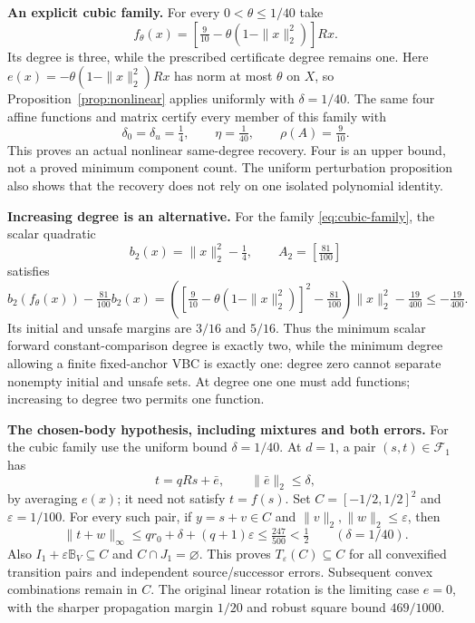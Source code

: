 \documentclass[10pt,letterpaper]{article}
\theoremstyle{remark}
\newcommand{\ball}{\mathbb B_V}
\begin{document}
\textbf{An explicit cubic family.}
For every $0<\theta\leq1/40$ take
\begin{equation}\label{eq:cubic-family}
 f_\theta(x)=\left[\tfrac9{10}-\theta(1-\|x\|_2^2)\right]Rx.
\end{equation}
Its degree is three, while the prescribed certificate degree remains one.
Here $e(x)=-\theta(1-\|x\|_2^2)Rx$ has norm at most $\theta$ on $X$,
so Proposition~\ref{prop:nonlinear} applies uniformly with $\delta=1/40$.
The same four affine functions and matrix certify every member of this family with
\[
 \delta_0=\delta_u=\tfrac14,\qquad \eta=\tfrac1{40},\qquad \rho(A)=\tfrac9{10}.
\]
This proves an actual nonlinear same-degree recovery. Four is an upper bound, not a proved minimum component count. The uniform perturbation proposition also shows that the recovery does not rely on one isolated polynomial identity.

\textbf{Increasing degree is an alternative.}
For the family \eqref{eq:cubic-family}, the scalar quadratic
\[
 b_2(x)=\|x\|_2^2-\tfrac14,\qquad A_2=[\tfrac{81}{100}]
\]
satisfies
\[
 b_2(f_\theta(x))-\tfrac{81}{100}b_2(x)
 =\left(\left[\tfrac9{10}-\theta(1-\|x\|_2^2)\right]^2-\tfrac{81}{100}\right)
       \|x\|_2^2-\tfrac{19}{400}
 \leq-\tfrac{19}{400}.
\]
Its initial and unsafe margins are $3/16$ and $5/16$. Thus the minimum
scalar forward constant-comparison degree is exactly two, while the minimum degree
allowing a finite fixed-anchor VBC is exactly one: degree zero cannot separate
nonempty initial and unsafe sets. At degree one one must add functions;
increasing to degree two permits one function.

\textbf{The chosen-body hypothesis, including mixtures and both errors.}
For the cubic family use the uniform bound $\delta=1/40$. At $d=1$, a pair $(s,t)\in\mathcal F_1$ has
\[
 t=qRs+\bar e,\qquad\|\bar e\|_2\leq\delta,
\]
by averaging $e(x)$; it need not satisfy $t=f(s)$.
Set $C=[-1/2,1/2]^2$ and $\varepsilon=1/100$.
For every such pair, if $y=s+v\in C$ and
$\|v\|_2,\|w\|_2\leq\varepsilon$, then
\[
 \|t+w\|_\infty
 \leq qr_0+\delta+(q+1)\varepsilon
 \leq\tfrac{247}{500}<\tfrac12
 \qquad(\delta=1/40).
\]
Also $I_1+\varepsilon\ball\subseteq C$ and $C\cap J_1=\varnothing$.
This proves $T_\varepsilon(C)\subseteq C$ for all convexified transition pairs
and independent source/successor errors. Subsequent convex combinations remain in $C$.
The original linear rotation is the limiting case $e=0$, with the sharper
propagation margin $1/20$ and robust square bound $469/1000$.
\end{document}
